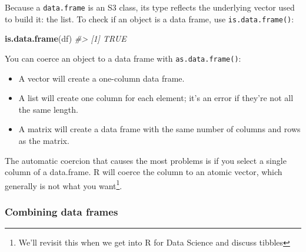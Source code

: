 \documentclass[]{book}
\newenvironment{Shaded}{\begin{snugshade}}{\end{snugshade}}
\newcommand{\KeywordTok}[1]{\textcolor[rgb]{0.13,0.29,0.53}{\textbf{#1}}}
\newcommand{\DataTypeTok}[1]{\textcolor[rgb]{0.13,0.29,0.53}{#1}}
\newcommand{\StringTok}[1]{\textcolor[rgb]{0.31,0.60,0.02}{#1}}
\newcommand{\CommentTok}[1]{\textcolor[rgb]{0.56,0.35,0.01}{\textit{#1}}}
\newcommand{\OtherTok}[1]{\textcolor[rgb]{0.56,0.35,0.01}{#1}}
\newcommand{\NormalTok}[1]{#1}
\let\rmarkdownfootnote\footnote%
\def\footnote{\protect\rmarkdownfootnote}
\theoremstyle{definition}
\theoremstyle{definition}
\theoremstyle{definition}
\theoremstyle{remark}
\begin{document}
Because a \texttt{data.frame} is an S3 class, its type reflects the
underlying vector used to build it: the list. To check if an object is a
data frame, use \texttt{is.data.frame()}:

\begin{Shaded}
\begin{Highlighting}[]
\KeywordTok{is.data.frame}\NormalTok{(df)}
\CommentTok{#> [1] TRUE}
\end{Highlighting}
\end{Shaded}

You can coerce an object to a data frame with \texttt{as.data.frame()}:

\begin{itemize}
\item
  A vector will create a one-column data frame.
\item
  A list will create one column for each element; it's an error if
  they're not all the same length.
\item
  A matrix will create a data frame with the same number of columns and
  rows as the matrix.
\end{itemize}

The automatic coercion that causes the most problems is if you select a
single column of a data.frame. R will coerce the column to an atomic
vector, which generally is not what you want\footnote{We'll revisit this
  when we get into R for Data Science and discuss tibbles}.

\begin{Shaded}
\end{Shaded}

\subsubsection{Combining data frames}\label{combining-data-frames}
\end{document}
